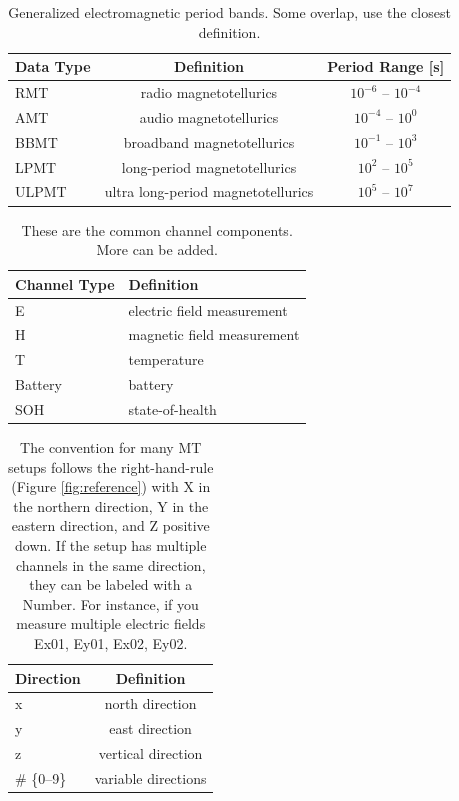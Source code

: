 \documentclass[12pt]{article}
\begin{document}
\begin{table}[h!]
	\centering
	\caption[Electromagnetic Period Bands]{Generalized electromagnetic period bands.  Some overlap, use the closest definition.}
	\begin{tabular}{lcc}
		\toprule
		\textbf{Data Type} & \textbf{Definition}  & \textbf{Period Range [s]} \\ \midrule
		RMT & radio magnetotellurics &  $10^{-6}$ -- $10^{-4}$\\ \midrule	
		AMT &  audio magnetotellurics & $10^{-4}$ -- $10^{0}$ \\ \midrule
		BBMT & broadband magnetotellurics & $10^{-1}$ -- $10^{3}$ \\ \midrule
		LPMT & long-period magnetotellurics  &  $10^{2}$ -- $10^{5}$ \\ \midrule
		ULPMT & ultra long-period magnetotellurics  &  $10^{5}$ -- $10^{7}$ \\ \bottomrule		
	\end{tabular}
	\label{tab:em}
\end{table}

\begin{table}[h!]
	\centering
	\caption[Channel Components]{These are the common channel components.  More can be added.}
	\begin{tabular}{ll}
		\toprule
		\textbf{Channel Type} & \textbf{Definition} \\ \midrule
		E & electric field measurement  \\ \midrule	
		H & magnetic field measurement \\ \midrule
		T & temperature \\ \midrule
		Battery & battery   \\ \midrule
		SOH & state-of-health   \\ \bottomrule		
	\end{tabular}
	\label{tab:channel_types}
\end{table}

\begin{table}[h!]
	\centering
	\caption[Channel Direction]{The convention for many MT setups follows the right-hand-rule (Figure \ref{fig:reference}) with X in the northern direction, Y in the eastern direction, and Z positive down.  If the setup has multiple channels in the same direction, they can be labeled with a Number.  For instance, if you measure multiple electric fields Ex01, Ey01, Ex02, Ey02.}
	\begin{tabular}{lc}
		\toprule
		\textbf{Direction} & \textbf{Definition} \\ \midrule
		x & north direction  \\ \midrule	
		y & east direction \\ \midrule
		z & vertical direction \\ \midrule
		\# \{0--9\} & variable directions   \\ \bottomrule		
	\end{tabular}
	\label{tab:diretions}
\end{table}
\end{document}

